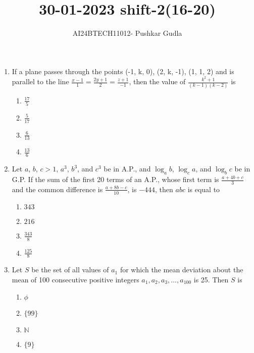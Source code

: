 \documentclass[journal,12pt,onecolumn]{IEEEtran}
\theoremstyle{remark}
\begin{document}

\vspace{3cm}

\title{\textbf{30-01-2023 shift-2(16-20)}}
\author{AI24BTECH11012- Pushkar Gudla}
\maketitle
\bigskip

\renewcommand{\thefigure}{\theenumi}
\renewcommand{\thetable}{\theenumi}
\setlength{\columnsep}{2.5em}

\begin{enumerate}
    \item If a plane passes through the points (-1, k, 0), (2, k, -1), (1, 1, 2) and is parallel to the line $\frac{x-1}{1} = \frac{2y+1}{2} = \frac{z+1}{-1}$, then the value of $\frac{k^2+1}{(k-1)(k-2)}$ is
    \begin{enumerate}
        \item $\frac{17}{5}$
        \item $\frac{5}{17}$
        \item $\frac{6}{13}$
        \item $\frac{13}{6}$
    \end{enumerate}
    
    \item Let $a$, $b$, $c > 1$, $a^3$, $b^3$, and $c^3$ be in A.P., and $\log_ab$, $\log_ca$, and $\log_bc$ be in G.P. If the sum of the first 20 terms of an A.P., whose first term is $\frac{a+4b+c}{3}$ and the common difference is $\frac{a+8b-c}{10}$, is $-444$, then $abc$ is equal to
    \begin{enumerate}
        \item $343$
        \item $216$
        \item $\frac{343}{8}$
        \item $\frac{125}{8}$
    \end{enumerate}

    \item Let $S$ be the set of all values of $a_1$ for which the mean deviation about the mean of 100 consecutive positive integers $a_1, a_2, a_3, \dots, a_{100}$ is 25. Then $S$ is
    \begin{enumerate}
        \item $\phi$
        \item $\{99\}$
        \item $\mathbb{N}$
        \item $\{9\}$
    \end{enumerate}


\end{enumerate}
\end{document}

